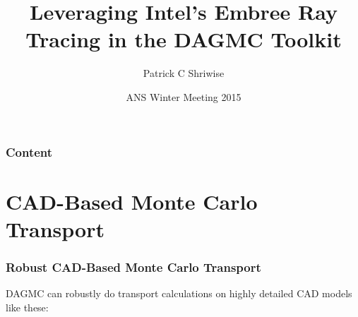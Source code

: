 \documentclass[12pt]{beamer}
\title{Leveraging Intel's Embree Ray Tracing in the DAGMC Toolkit}
\author{Patrick C Shriwise}
\institute{University of Wisconsin - Madison}
\date{ANS Winter Meeting 2015}
\begin{document}
\frame{\titlepage \addtocounter{framenumber}{-1}}


\begin{frame}
\frametitle{Content}
\tableofcontents
\end{frame}

\section{CAD-Based Monte Carlo Transport} %
\begin{frame}

\frametitle{Robust CAD-Based Monte Carlo Transport}

DAGMC can robustly do transport calculations on highly detailed CAD models like these:


\begin{center}
\begin{tabular}{c c}


\end{tabular}
\end{center}
\end{frame}
\end{document}
